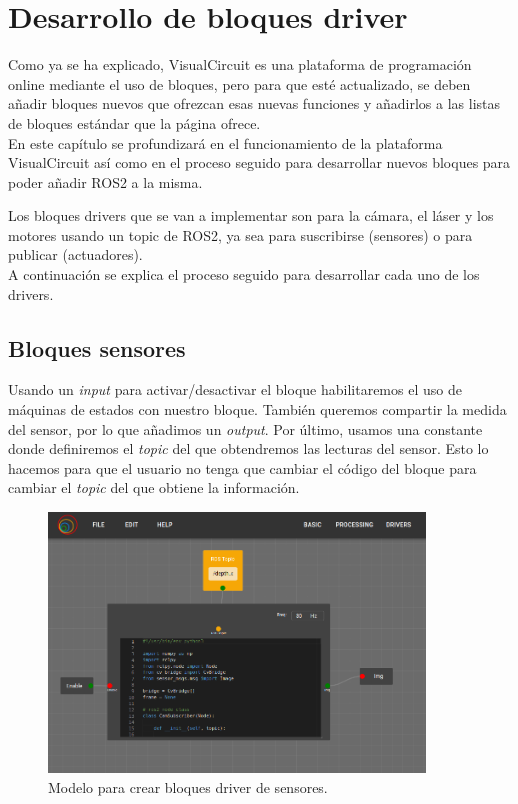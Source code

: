 \chapter{Desarrollo de bloques driver}
\label{cap:capitulo4}
Como ya se ha explicado, VisualCircuit es una plataforma de programación online mediante el uso de bloques, pero para que esté actualizado,
se deben añadir bloques nuevos que ofrezcan esas nuevas funciones y añadirlos a las listas de bloques estándar que la página ofrece.\\
En este capítulo se profundizará en el funcionamiento de la plataforma VisualCircuit así como en el proceso seguido para desarrollar nuevos
bloques para poder añadir ROS2 a la misma.

Los bloques drivers que se van a implementar son para la cámara, el láser y los motores usando un topic de ROS2, ya sea para suscribirse (sensores)
o para publicar (actuadores).\\
A continuación se explica el proceso seguido para desarrollar cada uno de los drivers.

\section{Bloques sensores}
\label{sec:blocks_sensores}

Usando un \textit{input} para activar/desactivar el bloque habilitaremos el uso de máquinas de estados con nuestro bloque.
También queremos compartir la medida del sensor, por lo que añadimos un \textit{output}. Por último, usamos una constante donde definiremos
el \textit{topic} del que obtendremos las lecturas del sensor. Esto lo hacemos para que el usuario no tenga que cambiar el código del bloque para cambiar
el \textit{topic} del que obtiene la información.\\
\begin{figure} [H]
  \begin{center}
      \includegraphics[width=10cm]{figs/c4/VC_driver_blocks.png}
  \end{center}
  \caption[Modelo bloque driver sensores]{Modelo para crear bloques driver de sensores.}
  \label{fig:VC_driver_model}
\end{figure}

